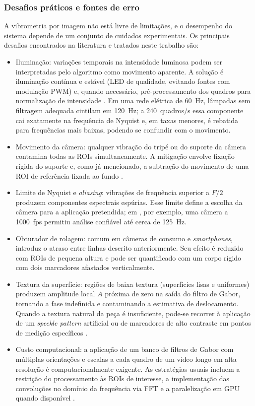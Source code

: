 \documentclass[a4paper,10pt,twocolumn]{article}
\begin{document}
\subsubsection{Desafios práticos e fontes de erro}

A vibrometria por imagem não está livre de limitações, e o desempenho do sistema depende de um conjunto de cuidados experimentais. Os principais desafios encontrados na literatura e tratados neste trabalho são:

\begin{itemize}
    \item Iluminação: variações temporais na intensidade luminosa podem ser interpretadas pelo algoritmo como movimento aparente. A solução é iluminação contínua e estável (LED de qualidade, evitando fontes com modulação PWM) e, quando necessário, pré-processamento dos quadros para normalização de intensidade \cite{robotcamera2025}. Em uma rede elétrica de 60~Hz, lâmpadas sem filtragem adequada cintilam em 120~Hz; a 240~quadros/s essa componente cai exatamente na frequência de Nyquist e, em taxas menores, é rebatida para frequências mais baixas, podendo se confundir com o movimento.
    \item Movimento da câmera: qualquer vibração do tripé ou do suporte da câmera contamina todas as ROIs simultaneamente. A mitigação envolve fixação rígida do suporte e, como já mencionado, a subtração do movimento de uma ROI de referência fixada ao fundo \cite{Mhatre2026}.
    \item Limite de Nyquist e \textit{aliasing}: vibrações de frequência superior a $F/2$ produzem componentes espectrais espúrias. Esse limite define a escolha da câmera para a aplicação pretendida; em \cite{robotcamera2025}, por exemplo, uma câmera a 1000~fps permitiu análise confiável até cerca de 125~Hz.
    \item Obturador de rolagem: comum em câmeras de consumo e \textit{smartphones}, introduz o atraso entre linhas descrito anteriormente. Seu efeito é reduzido com ROIs de pequena altura e pode ser quantificado com um corpo rígido com dois marcadores afastados verticalmente.
    \item Textura da superfície: regiões de baixa textura (superfícies lisas e uniformes) produzem amplitude local $A$ próxima de zero na saída do filtro de Gabor, tornando a fase indefinida e contaminando a estimativa de deslocamento. Quando a textura natural da peça é insuficiente, pode-se recorrer à aplicação de um \textit{speckle pattern} artificial ou de marcadores de alto contraste em pontos de medição específicos \cite{robotcamera2025, Mhatre2026}.
    \item Custo computacional: a aplicação de um banco de filtros de Gabor com múltiplas orientações e escalas a cada quadro de um vídeo longo em alta resolução é computacionalmente exigente. As estratégias usuais incluem a restrição do processamento às ROIs de interesse, a implementação das convoluções no domínio da frequência via FFT e a paralelização em GPU quando disponível \cite{robotcamera2025}.
\end{itemize}
\end{document}
